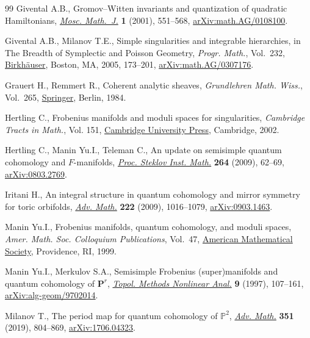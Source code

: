 \documentclass[pdftex]{sigma}
\numberwithin{equation}{section}
\begin{document}
\begin{thebibliography}{99}
Givental A.B., Gromov--{W}itten invariants and quantization of quadratic
 {H}amiltonians, \href{https://doi.org/10.17323/1609-4514-2001-1-4-551-568}{\textit{Mosc. Math.~J.}} \textbf{1} (2001), 551--568,
 \href{https://arxiv.org/abs/math.AG/0108100}{arXiv:math.AG/0108100}.

Givental A.B., Milanov T.E., Simple singularities and integrable hierarchies,
 in The {B}readth of {S}ymplectic and {P}oisson {G}eometry, \textit{Progr.
 Math.}, Vol.~232, \href{https://doi.org/10.1007/0-8176-4419-9_7}{Birkh\"auser}, Boston, MA, 2005, 173--201,
 \href{https://arxiv.org/abs/math.AG/0307176}{arXiv:math.AG/0307176}.

Grauert H., Remmert R., Coherent analytic sheaves, \textit{Grundlehren Math.
 Wiss.}, Vol.~265, \href{https://doi.org/10.1007/978-3-642-69582-7}{Springer}, Berlin, 1984.

Hertling C., Frobenius manifolds and moduli spaces for singularities,
 \textit{Cambridge Tracts in Math.}, Vol. 151, \href{https://doi.org/10.1017/CBO9780511543104}{Cambridge University Press},
 Cambridge, 2002.

Hertling C., Manin Yu.I., Teleman C., An update on semisimple quantum cohomology
 and {$F$}-manifolds, \href{https://doi.org/10.1134/S0081543809010088}{\textit{Proc. Steklov Inst. Math.}} \textbf{264} (2009),
 62--69, \href{https://arxiv.org/abs/0803.2769}{arXiv:0803.2769}.

Iritani H., An integral structure in quantum cohomology and mirror symmetry for
 toric orbifolds, \href{https://doi.org/10.1016/j.aim.2009.05.016}{\textit{Adv. Math.}} \textbf{222} (2009), 1016--1079,
 \href{https://arxiv.org/abs/0903.1463}{arXiv:0903.1463}.

Manin Yu.I., Frobenius manifolds, quantum cohomology, and moduli spaces,
 \textit{Amer. Math. Soc. Colloquium Publications}, Vol.~47, \href{https://doi.org/10.1090/coll/047}{American
 Mathematical Society}, Providence, RI, 1999.

Manin Yu.I., Merkulov S.A., Semisimple {F}robenius (super)manifolds and quantum
 cohomology of {${\mathbf P}^r$}, \href{https://doi.org/10.12775/TMNA.1997.006}{\textit{Topol. Methods Nonlinear Anal.}}
 \textbf{9} (1997), 107--161, \href{https://arxiv.org/abs/alg-geom/9702014}{arXiv:alg-geom/9702014}.

Milanov T., The period map for quantum cohomology of {$\mathbb{P}^2$},
 \href{https://doi.org/10.1016/j.aim.2019.05.011}{\textit{Adv. Math.}} \textbf{351} (2019), 804--869, \href{https://arxiv.org/abs/1706.04323}{arXiv:1706.04323}.


\end{thebibliography}
\end{document}
